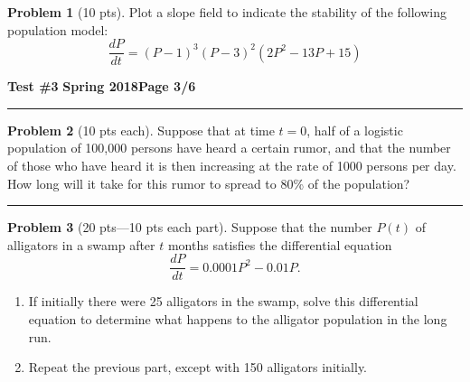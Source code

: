 \documentclass[12pt]{article}
\theoremstyle{definition}
\newtheorem{problem}{Problem}
\begin{document}
\begin{problem}[10 pts]
Plot a slope field to indicate the stability of the following population model:
\begin{equation*}
\frac{dP}{dt} = (P-1)^3(P-3)^2(2P^2-13P+15)
\end{equation*}
\end{problem}

\newpage

\hfill{\large\bf Test \#3}\hfill{\large\bf
  Spring 2018}\hfill{\large\bf Page 3/6}\hrule

\bigskip
\begin{problem}[10 pts each]
Suppose that at time $t=0$, half of a logistic population of 100,000 persons have heard a certain rumor, and that the number of those who have heard it is then increasing­ at the rate of 1000 persons per day. How long will it take for this rumor to spread to 80\% of the population?
\vspace{4cm}
\begin{flushright}
\end{flushright}
\end{problem}
\hrule

\begin{problem}[20 pts---10 pts each part]
Suppose that the number $P(t)$ of alligators in a swamp after $t$ months satisfies the differential equation 
\begin{equation*}
\frac{dP}{dt} = 0.0001 P^2 - 0.01 P.
\end{equation*}
\begin{enumerate}
  \item If initially there were 25 alligators in the swamp, solve this differential equation to determine what happens to the alligator population in the long run.
\vspace{3.5cm}
\begin{flushright}
\end{flushright}
  \item Repeat the previous part, except with 150 alligators initially.
\vspace{3.5cm}
\begin{flushright}
\end{flushright}
\end{enumerate}
\end{problem}
\end{document}
